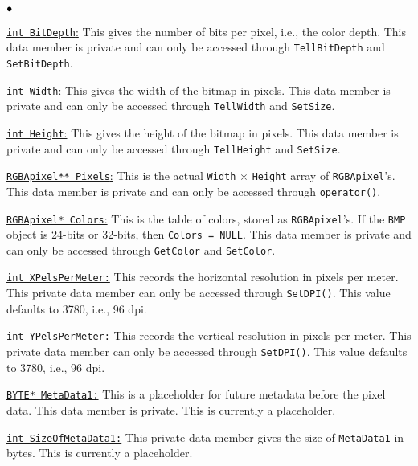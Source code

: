 \documentclass[12pt]{article}
\begin{document}
\begin{list}{$\bullet\hspace{.125in}$}{}
\item 
\underline{\texttt{int BitDepth}:} This gives the number of bits per pixel, 
i.e., the color depth. This data member is private and can only be 
accessed through \texttt{TellBitDepth} and \texttt{SetBitDepth}.
\item 
\underline{\texttt{int Width}:} This gives the width of the 
bitmap in pixels. This data member is private and can only be 
accessed through \texttt{TellWidth} and \texttt{SetSize}.
\item 
\underline{\texttt{int Height}:} This gives the height of the 
bitmap in pixels. This data member is private and can only be 
accessed through \texttt{TellHeight} and \texttt{SetSize}.

\item 
\underline{\texttt{RGBApixel** Pixels}:} This is the actual 
\texttt{Width} $\times$ \texttt{Height} array of \texttt{RGBApixel}'s. 
This data member is private and can only be accessed through 
\texttt{operator()}.

\item 
\underline{\texttt{RGBApixel* Colors}:} This is the table of colors, 
stored as \texttt{RGBApixel}'s. If the \texttt{BMP} object is 
24-bits or 32-bits, then \texttt{Colors = NULL}. This data member 
is private and can only be accessed through \texttt{GetColor} 
and \texttt{SetColor}.

\item 
\underline{\texttt{int XPelsPerMeter:}} This records the horizontal resolution in pixels per meter. This 
private data member can only be accessed through 
\texttt{SetDPI()}. This value defaults to 3780, i.e., 
96 dpi.

\item 
\underline{\texttt{int YPelsPerMeter:}} This records the vertical resolution in pixels per meter. This 
private data member can only be accessed through 
\texttt{SetDPI()}. This value defaults to 3780, i.e., 
96 dpi.

\item 
\underline{\texttt{BYTE* MetaData1:}}
This is a placeholder for future metadata before the 
pixel data. This data member is private. This is currently a 
placeholder.

\item 
\underline{\texttt{int SizeOfMetaData1:}} This 
private data member gives the size of 
\texttt{MetaData1} in bytes. This is currently a 
placeholder.


\end{list}
\end{document}
